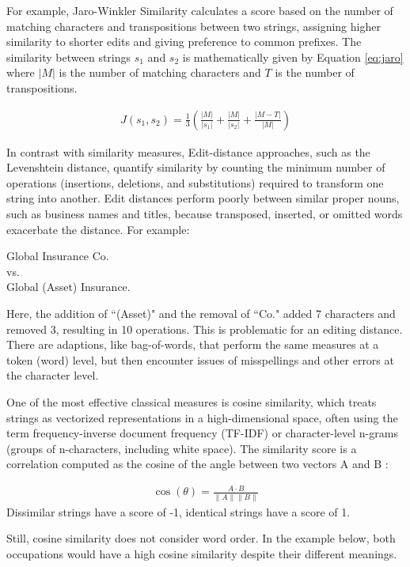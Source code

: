 \documentclass[12pt]{article}
\begin{document}
For example, Jaro-Winkler Similarity calculates a score based on the number of matching characters and transpositions between two strings, assigning higher similarity to shorter edits and giving preference to common prefixes. The similarity between strings $s_1$ and $s_2$ is mathematically given by Equation \ref{eq:jaro} where  $|M|$  is the number of matching characters and  $T$  is the number of transpositions.

\begin{align} \label{eq:jaro}
    J(s_1, s_2) = \frac{1}{3} \left(\frac{|M|}{|s_1|} + \frac{|M|}{|s_2|} + \frac{|M - T|}{|M|} \right)
\end{align}


In contrast with similarity measures, Edit-distance approaches, such as the Levenshtein distance, quantify similarity by counting the minimum number of operations (insertions, deletions, and substitutions) required to transform one string into another.
Edit distances perform poorly between similar proper nouns, such as business names and titles, because transposed, inserted, or omitted words exacerbate the distance. For example: 

\begin{center}
    Global Insurance Co. \\vs.\\ 
    Global (Asset) Insurance. 
\end{center}
Here, the addition of ``(Asset)" and the removal of ``Co." added 7 characters and removed 3, resulting in 10 operations. This is problematic for an editing distance. There are adaptions, like bag-of-words, that perform the same measures at a token (word) level, but then encounter issues of misspellings and other errors at the character level. 

One of the most effective classical measures is cosine similarity, which treats strings as vectorized representations in a high-dimensional space, often using the term frequency-inverse document frequency (TF-IDF) or character-level n-grams (groups of n-characters, including white space). The similarity score is a correlation computed as the cosine of the angle between two vectors A and B :

\begin{align}
    \cos(\theta) = \frac{A \cdot B}{\|A\| \|B\|}
\end{align}
Dissimilar strings have a score of -1, identical strings have a score of 1. 

Still, cosine similarity does not consider word order. In the example below, both occupations would have a high cosine similarity despite their different meanings.
\end{document}
